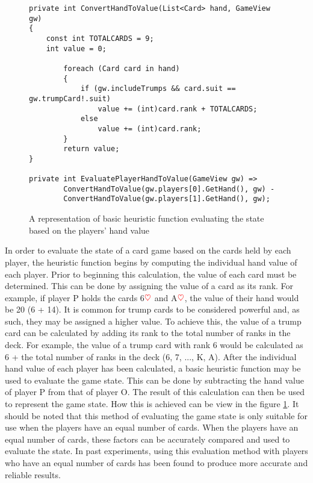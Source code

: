 \begin{figure}[h]
\captionsetup{justification=centering}
\begin{lstlisting}
private int ConvertHandToValue(List<Card> hand, GameView gw)
{
	const int TOTALCARDS = 9;
	int value = 0;

    	foreach (Card card in hand)
    	{
        	if (gw.includeTrumps && card.suit == gw.trumpCard!.suit)
            	value += (int)card.rank + TOTALCARDS;
        	else
            	value += (int)card.rank;
    	}
    	return value;
}

private int EvaluatePlayerHandToValue(GameView gw) =>
    	ConvertHandToValue(gw.players[0].GetHand(), gw) -
    	ConvertHandToValue(gw.players[1].GetHand(), gw);
\end{lstlisting}
\caption{A representation of basic heuristic function evaluating the state based on the players' hand value}
\label{fig:BHPlayersHandValue}
\end{figure}

In order to evaluate the state of a card game based on the cards held by each player, the heuristic function begins by computing the individual hand value of each player. Prior to beginning this calculation, the value of each card must be determined. This can be done by assigning the value of a card as its rank. For example, if player P holds the cards 6$\textcolor{red}{\heartsuit}$ and A$\textcolor{red}{\heartsuit}$, the value of their hand would be 20 (6 + 14). It is common for trump cards to be considered powerful and, as such, they may be assigned a higher value. To achieve this, the value of a trump card can be calculated by adding its rank to the total number of ranks in the deck. For example, the value of a trump card with rank 6 would be calculated as 6 + the total number of ranks in the deck (6, 7, ..., K, A). After the individual hand value of each player has been calculated, a basic heuristic function may be used to evaluate the game state. This can be done by subtracting the hand value of player P from that of player O. The result of this calculation can then be used to represent the game state. How this is achieved can be view in the figure \ref{fig:BHPlayersHandValue}. It should be noted that this method of evaluating the game state is only suitable for use when the players have an equal number of cards. When the players have an equal number of cards, these factors can be accurately compared and used to evaluate the state. In past experiments, using this evaluation method with players who have an equal number of cards has been found to produce more accurate and reliable results.

